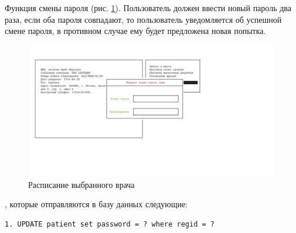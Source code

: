 \documentclass[14pt,a4paper,russian]{extreport}
\begin{document}
Функция смены пароля (рис. \ref{fig:pass-change}). Пользователь должен ввести новый пароль два раза, если оба пароля совпадают, то пользователь уведомляется об успешной смене пароля, в противном случае ему будет предложена новая попытка.\par
\begin{figure}[h!]
        \includegraphics[width=\textwidth]{prog_int/pass-change}
        \caption{Расписание выбранного врача}
		\label{fig:pass-change}
\end{figure}
, которые отправляются в базу данных следующие: 
\begin{lstlisting}[style=csql] 
1. UPDATE patient set password = ? where regid = ?
\end{lstlisting}
\end{document}
